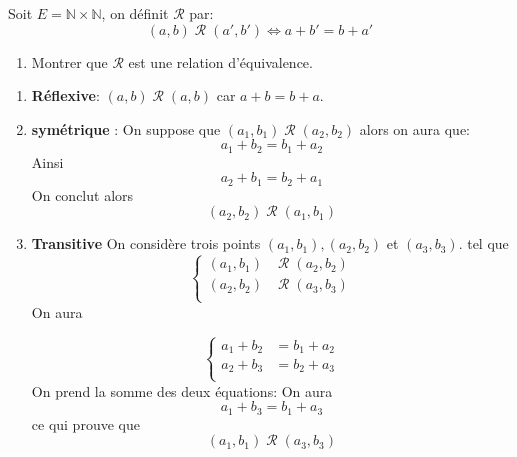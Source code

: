 \documentclass{report}
\begin{document}


\qs{}
{
  Soit $E=\mathbb{N}\times\mathbb{N}$, on d\'efinit $\mathcal{R}$ par:\\

$$(a,b)\;\mathcal{R}\;(a',b')\iff a+b'=b+a'$$
\begin{enumerate}
  \item Montrer que $\mathcal{R}$ est une relation d'équivalence.
\end{enumerate}
}

\begin{myproof}
 \begin{enumerate}
   \item \textbf{Réflexive}: $(a,b)\;\mathcal{R}\; (a,b)$ car $a + b = b + a$.\\
   \item \textbf{symétrique} : 
     On suppose que $(a_1,b_1)\;\mathcal{R}\; (a_2,b_2)$ alors on aura que:
     $$
     a_1 + b_2 = b_1 + a_2
     $$
     Ainsi 
     $$
     a_2 + b_1 = b_2 + a_1
     $$
     On conclut alors 
     $$
     (a_2,b_2)\;\mathcal{R}\; (a_1,b_1)
     $$
   \item \textbf{Transitive}
     On considère trois points $(a_1,b_1), (a_2,b_2)$ et $(a_3, b_3)$. tel que
     $$
     \begin{cases}
       (a_1,b_1) \;&\mathcal{R}\; (a_2,b_2)\\
       (a_2,b_2) \;&\mathcal{R}\; (a_3,b_3)\\
     \end{cases}
     $$
     On aura 

     $$
     \begin{cases}
       a_1 + b_2 &= b_1 + a_2\\
       a_2 + b_3 &= b_2 + a_3\\
     \end{cases}
     $$
     On prend la somme des deux équations:
     On aura 
     $$
     a_1 + b_3 = b_1 + a_3
     $$
     ce qui prouve que 
     $$
     (a_1,b_1) \;\mathcal{R}\; (a_3, b_3)
     $$

     
 \end{enumerate} 
\end{myproof}
\end{document}
